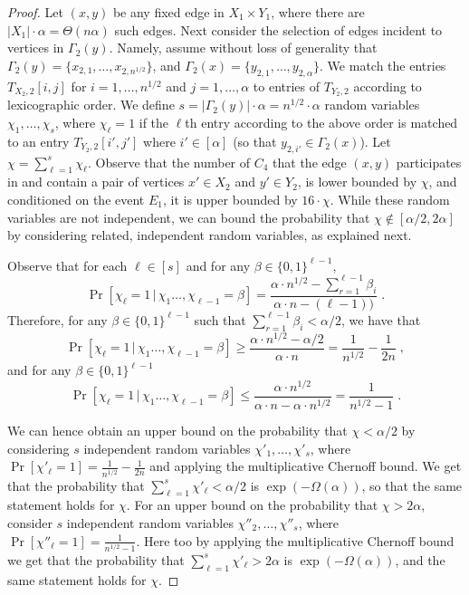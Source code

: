 \begin{proof}
Let $(x,y)$ be any fixed edge in $X_1\times Y_1$, where there are $|X_1| \cdot \alpha = \Theta(n\alpha)$ such edges.
Next consider the selection of edges incident to vertices in $\Gamma_2(y)$. Namely, assume without loss of generality that $\Gamma_2(y) = \{x_{2,1},\dots,x_{2,n^{1/2}}\}$, and $\Gamma_2(x) = \{y_{2,1},\dots,y_{2,\alpha}\}$. We match the entries $T_{X_2,2}[i,j]$ for $i=1,\dots,n^{1/2}$ and $j=1,\dots,\alpha$ to entries of $T_{Y_2,2}$ according to lexicographic order.
We define $s=|\Gamma_2(y)|\cdot \alpha = n^{1/2}\cdot \alpha$ random variables $\chi_1,\dots,\chi_s$, where $\chi_\ell = 1$ if the $\ell$th entry according to the above order is matched to an entry $T_{Y_2,2}[i',j']$ where $i'\in [\alpha]$ (so that $y_{2,i'}\in \Gamma_2(x)$). Let $\chi = \sum_{\ell=1}^s \chi_\ell$.  Observe that the number of $C_4$ that the edge $(x,y)$ participates in and contain a pair of vertices $x' \in X_2$ and $y' \in Y_2$, is lower bounded by $\chi$, and conditioned on the event $E_1$, it is upper bounded by
$16\cdot \chi$. 
While these random variables are not independent, we can bound the probability that $\chi \notin [\alpha/2,2\alpha]$
by considering related, independent random variables, as explained next.

Observe that for each $\ell \in [s]$ 
and for any $\beta \in \{0,1\}^{\ell-1}$,
$$\Pr[\chi_\ell=1 \,|\, \chi_1\dots,\chi_{\ell-1}=\beta] = 
       \frac{\alpha\cdot n^{1/2} - \sum_{r=1}^{\ell-1}\beta_i}{\alpha\cdot n - (\ell-1))}\;.$$
Therefore, for any $\beta \in \{0,1\}^{\ell-1}$ such that $\sum_{r=1}^{\ell-1}\beta_i < \alpha/2$, we have that 
$$\Pr[\chi_\ell=1 \,|\, \chi_1\dots,\chi_{\ell-1}=\beta] \geq 
           \frac{\alpha\cdot n^{1/2} - \alpha/2} {\alpha\cdot n } = \frac{1}{n^{1/2}}-\frac{1}{2n}\;,$$
and for any $\beta \in \{0,1\}^{\ell-1}$ 
$$\Pr[\chi_\ell=1 \,|\, \chi_1\dots,\chi_{\ell-1}=\beta] \leq 
    \frac{\alpha\cdot n^{1/2}}{\alpha\cdot n - \alpha\cdot n^{1/2}} = \frac{1}{n^{1/2}-1}\;.$$

We can hence obtain an upper bound on the probability that $\chi < \alpha/2$ by considering $s$ independent random variables $\chi'_1,\dots,\chi'_s$, where $\Pr[\chi'_\ell=1] = \frac{1}{n^{1/2}}-\frac{1}{2n}$ and applying the multiplicative Chernoff bound. We get that the probability that $\sum_{\ell=1}^s \chi'_\ell < \alpha/2$ is $\exp(-\Omega(\alpha))$, so that the same statement holds for $\chi$. For an upper bound on the probability that $\chi > 2 \alpha$, consider $s$ independent random variables $\chi''_2,\dots,\chi''_s$, where $\Pr[\chi''_\ell=1] = \frac{1}{n^{1/2}-1}$. Here too by applying the multiplicative Chernoff bound we get that the probability that $\sum_{\ell=1}^s \chi'_\ell > 2\alpha$ is $\exp(-\Omega(\alpha))$, and the same statement holds for $\chi$.


\end{proof}

